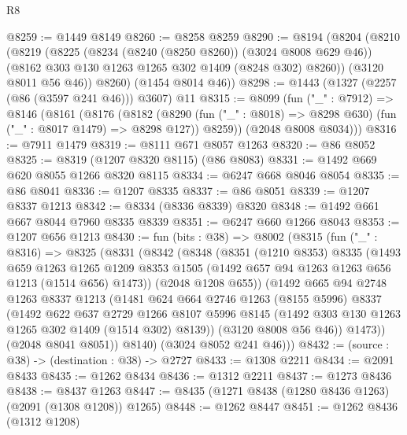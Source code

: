 \begin{lexlean}{R8}
\begin{coremodule}
@8259 := @1449 @8149
@8260 := @8258 @8259
@8290 := @8194
    (@8204
      (@8210
        (@8219
          (@8225
            (@8234 (@8240 (@8250 @8260)) (@3024 @8008 @629 @46))
            (@8162 @303 @130 @1263 @1265 @302 @1409 (@8248 @302) @8260))
          (@3120 @8011 @56 @46))
        @8260)
      (@1454 @8014 @46))
@8298 := @1443 (@1327 (@2257 (@86 (@3597 @241 @46))) @3607) @11
@8315 := @8099
    (fun ("_" : @7912) =>
    @8146
      (@8161
        (@8176
          (@8182
            (@8290 (fun ("_" : @8018) => @8298 @630) (fun ("_" : @8017 @1479) => @8298 @127))
            @8259))
        (@2048 @8008 @8034)))
@8316 := @7911 @1479
@8319 := @8111 @671 @8057 @1263
@8320 := @86 @8052
@8325 := @8319 (@1207 @8320 @8115) (@86 @8083)
@8331 := @1492 @669 @620 @8055 @1266 @8320 @8115
@8334 := @6247 @668 @8046 @8054
@8335 := @86 @8041
@8336 := @1207 @8335
@8337 := @86 @8051
@8339 := @1207 @8337 @1213
@8342 := @8334 (@8336 @8339) @8320
@8348 := @1492 @661 @667 @8044 @7960 @8335 @8339
@8351 := @6247 @660 @1266 @8043
@8353 := @1207 @656 @1213
@8430 := fun (bits : @38) =>
  @8002
    (@8315
      (fun ("_" : @8316) =>
      @8325
        (@8331
          (@8342
            (@8348
              (@8351
                (@1210 @8353)
                @8335
                (@1493
                  @659
                  @1263
                  @1265
                  @1209
                  @8353
                  @1505
                  (@1492 @657 @94 @1263 @1263 @656 @1213 (@1514 @656) @1473))
                (@2048 @1208 @655))
              (@1492
                @665
                @94
                @2748
                @1263
                @8337
                @1213
                (@1481
                  @624
                  @664
                  @2746
                  @1263
                  (@8155 @5996)
                  @8337
                  (@1492
                    @622
                    @637
                    @2729
                    @1266
                    @8107
                    @5996
                    @8145
                    (@1492 @303 @130 @1263 @1265 @302 @1409 (@1514 @302) @8139))
                  (@3120 @8008 @56 @46))
                @1473))
            (@2048 @8041 @8051))
          @8140)
        (@3024 @8052 @241 @46)))
@8432 := (source : @38) -> (destination : @38) -> @2727
@8433 := @1308 @2211
@8434 := @2091 @8433
@8435 := @1262 @8434
@8436 := @1312 @2211
@8437 := @1273 @8436
@8438 := @8437 @1263
@8447 := @8435 (@1271 @8438 (@1280 @8436 @1263) (@2091 (@1308 @1208)) @1265)
@8448 := @1262 @8447
@8451 := @1262 @8436 (@1312 @1208)

\end{coremodule}
\end{lexlean}
